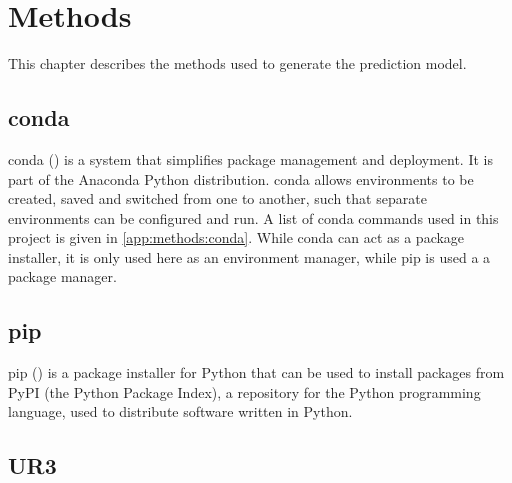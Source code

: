 

\chapter{Methods}
\label{Methods} 

This chapter describes the methods used to generate the prediction model.

\section{conda}


conda (\cite{Conda2021}) is a system that simplifies package management and deployment. It is part of the Anaconda Python distribution. conda allows environments to be created, saved and switched from one to another, such that separate environments can be configured and run. A list of conda commands used in this project is given in \ref{app:methods:conda}. While conda can act as a package installer, it is only used here as an environment manager, while pip is used a a package manager.

\section{pip}

pip (\cite{pip2021}) is a package installer for Python that can be used to install packages from PyPI (the Python Package Index), a repository for the Python programming language, used to distribute software written in Python.

\section{UR3}

